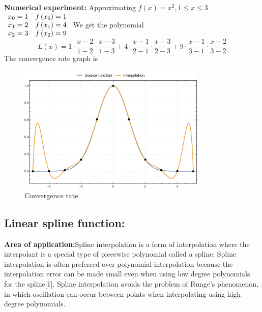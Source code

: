 \documentclass{article}
\begin{document}
{\bf Numerical experiment:}
Approximating $ f(x)=x^2, 1\leq x\leq 3$
$\begin{array} { l l } { x _ { 0 } = 1 } & { f \left( x _ { 0 } \right) = 1 } \\ { x _ { 1 } = 2 } & { f \left( x _ { 1 } \right) = 4 } \\ { x _ { 2 } = 3 } & { f \left( x _ { 2 } \right) = 9 } \end{array}$
We get the polynomial
\[L ( x ) = 1 \cdot \frac { x - 2 } { 1 - 2 } \cdot \frac { x - 3 } { 1 - 3 } + 4 \cdot \frac { x - 1 } { 2 - 1 } \cdot \frac { x - 3 } { 2 - 3 } + 9 \cdot \frac { x - 1 } { 3 - 1 } \cdot \frac { x - 2 } { 3 - 2 }\]
The convergence rate graph is
\begin{figure}[H]
	\caption{Convergence rate}
	\includegraphics[width=0.8\textwidth, height=0.6\textwidth]{lagrange_poly.png}
\end{figure}
	\subsection{Linear spline function:}
{\bf Area of application:}Spline interpolation is a form of interpolation where the interpolant is a special type of piecewise polynomial called a spline. Spline interpolation is often preferred over polynomial interpolation because the interpolation error can be made small even when using low degree polynomials for the spline[1]. Spline interpolation avoids the problem of Runge's phenomenon, in which oscillation can occur between points when interpolating using high degree polynomials.
\end{document}

